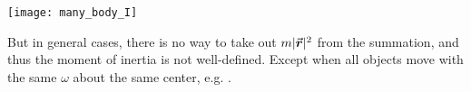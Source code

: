 \documentclass[class=article, crop=false, 12pt]{standalone}
\begin{document}
\begin{enumerate}
    \begin{center}
        \begin{minipage}{0.4\linewidth}
        \end{minipage}
        \hspace{0.05\textwidth}
        \begin{minipage}{0.25\linewidth}
            \centering
            \texttt{[image: many\_body\_I]}
        \end{minipage}
    \end{center}
    
    But in general cases, there is no way to take out $m|\va*{r}|^2$ from the summation, 
    and thus the moment of inertia is not well-defined. 
    Except when all objects move with the same $\omega$ about the same center,
    e.g. .
    
\end{enumerate}
\end{document}
